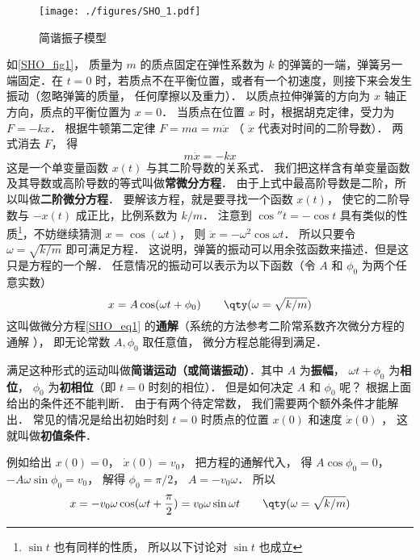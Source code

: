

\begin{figure}[ht]
\centering
\texttt{[image: ./figures/SHO\_1.pdf]}
\caption{简谐振子模型} \label{SHO_fig1}
\end{figure}

如\autoref{SHO_fig1}， 质量为 $m$ 的质点固定在弹性系数为 $k$ 的弹簧的一端，弹簧另一端固定．在 $t = 0$ 时，若质点不在平衡位置，或者有一个初速度，则接下来会发生振动（忽略弹簧的质量， 任何摩擦以及重力）． 以质点拉伸弹簧的方向为 $x$ 轴正方向，质点的平衡位置为 $x = 0$． 当质点在位置 $x$ 时，根据胡克定律，受力为 $F =  - kx$． 根据牛顿第二定律 $F = ma = m\ddot x$ （ $\ddot x$ 代表对时间的二阶导数）．  两式消去 $F$， 得
\begin{equation}\label{SHO_eq1}
m\ddot x =  - kx
\end{equation}
这是一个单变量函数 $x(t)$ 与其二阶导数的关系式． 我们把这样含有单变量函数及其导数或高阶导数的等式叫做\textbf{常微分方程}． 由于上式中最高阶导数是二阶，所以叫做\textbf{二阶微分方程}． 要解该方程，就是要寻找一个函数 $x(t)$， 使它的二阶导数与 $- x(t)$ 成正比，比例系数为 $k/m$． 注意到 $\cos'' t =  - \cos t$ 具有类似的性质\footnote{$\sin t$ 也有同样的性质， 所以以下讨论对 $\sin t$ 也成立}，不妨继续猜测 $x = \cos(\omega t)$， 则 $\ddot x =  - {\omega ^2}\cos \omega t$． 所以只要令 $\omega = \sqrt{k/m}$ 即可满足方程． 这说明，弹簧的振动可以用余弦函数来描述．但是这只是方程的一个解． 任意情况的振动可以表示为以下函数（令 $A$ 和 $\phi_0$ 为两个任意实数）
\begin{equation}\label{SHO_eq2}
x = A\cos(\omega t + \phi_0)  \qquad \qty(\omega  = \sqrt{k/m})
\end{equation}
这叫做微分方程\autoref{SHO_eq1} 的\textbf{通解}（系统的方法参考二阶常系数齐次微分方程的通解
）， 即无论常数 $A, \phi_0$ 取任意值， 微分方程总能得到满足．

满足这种形式的运动叫做\textbf{简谐运动（或简谐振动）}．其中 $A$ 为\textbf{振幅}， $\omega t + \phi_0$ 为\textbf{相位}， $\phi_0$ 为\textbf{初相位}（即 $t = 0$ 时刻的相位）． 但是如何决定 $A$ 和 $\phi_0$ 呢？ 根据上面给出的条件还不能判断． 由于有两个待定常数， 我们需要两个额外条件才能解出． 常见的情况是给出初始时刻 $t = 0$ 时质点的位置 $x(0)$ 和速度 $\dot x(0)$ ， 这就叫做\textbf{初值条件}．

例如给出 $x(0) = 0$，  $\dot x(0) = v_0$， 把方程的通解代入， 得 $A\cos \phi_0 = 0$，  $ - A\omega \sin \phi_0 = v_0$， 解得 $\phi_0 = \pi /2$，  $A =  -v_0\omega $． 所以
\begin{equation}
x =  - v_0\omega \cos (\omega t + \frac{\pi }{2}) = v_0\omega \sin \omega t \qquad \qty(\omega  = \sqrt{k/m})
\end{equation}

